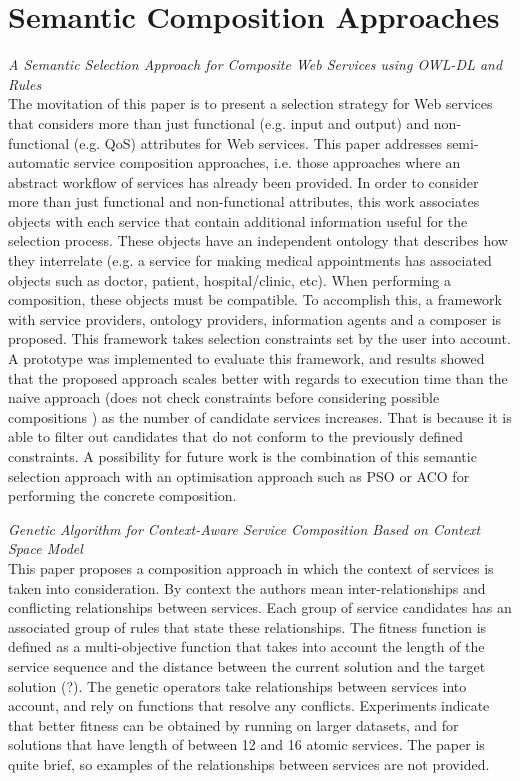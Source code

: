 \section{Semantic Composition Approaches}
\textit{A Semantic Selection Approach for Composite Web Services using OWL-DL and Rules \cite{DBLP:journals/soca/BoustilMS14}}\\
The movitation of this paper is to present a selection strategy for Web services that considers more than just functional (e.g.
input and output) and non-functional (e.g. QoS) attributes for Web services. This paper addresses semi-automatic service composition
approaches, i.e. those approaches where an abstract workflow of services has already been provided. In order to consider more than
just functional and non-functional attributes, this work associates objects with each service that contain additional information
useful for the selection process. These objects have an independent ontology that describes how they interrelate (e.g. a service
for making medical appointments has associated objects such as doctor, patient, hospital/clinic, etc). When performing a composition,
these objects must be compatible. To accomplish this, a framework with service providers, ontology providers, information agents and a
composer is proposed. This framework takes selection constraints set by the user into account. A prototype was implemented to evaluate
this framework, and results showed that the proposed approach scales better with regards to execution time than the naive approach (does
not check constraints before considering possible compositions ) as the number of candidate services increases. That is because it is
able to filter out candidates that do not conform to the previously defined constraints. A possibility for future work is the combination
of this semantic selection approach with an optimisation approach such as PSO or ACO for performing the concrete composition.

\textit{Genetic Algorithm for Context-Aware Service Composition Based on Context Space Model \cite{zhang2013genetic}}\\
This paper proposes a composition approach in which the context of services is taken into consideration. By context the authors mean
inter-relationships and conflicting relationships between services. Each group of service candidates has an associated group of
rules that state these relationships. The fitness function is defined as a multi-objective function that takes into account the
length of the service sequence and the distance between the current solution and the target solution (?). The genetic operators
take relationships between services into account, and rely on functions that resolve any conflicts. Experiments indicate that
better fitness can be obtained by running on larger datasets, and for solutions that have length of between 12 and 16 atomic
services. The paper is quite brief, so examples of the relationships between services are not provided.

